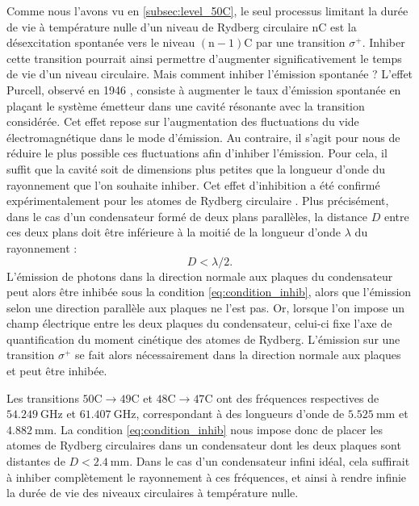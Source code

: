 Comme nous l'avons vu en \ref{subsec:level_50C}, le seul processus limitant la durée de vie à température nulle d'un niveau de Rydberg circulaire $\mathrm{nC}$ est la désexcitation spontanée vers le niveau $\mathrm{(n-1)C}$ par une transition $\sigma^+$.
Inhiber cette transition pourrait ainsi permettre d'augmenter significativement le temps de vie d'un niveau circulaire.
Mais comment inhiber l'émission spontanée ?
L'effet Purcell, observé en 1946 \cite{Purcell46_Purcelleffect}, consiste à augmenter le taux d'émission spontanée en plaçant le système émetteur dans une cavité résonante avec la transition considérée.
Cet effet repose sur l'augmentation des fluctuations du vide électromagnétique dans le mode d'émission.
Au contraire, il s'agit pour nous de réduire le plus possible ces fluctuations afin d'inhiber l'émission.
Pour cela, il suffit que la cavité soit de dimensions plus petites que la longueur d'onde du rayonnement que l'on souhaite inhiber.
Cet effet d'inhibition a été confirmé expérimentalement pour les atomes de Rydberg circulaire \cite{MX_KELPPNER_INHIBITION,MX_KLEPPNERINHIBITION85}.
Plus précisément, dans le cas d'un condensateur formé de deux plans parallèles, la distance $D$ entre ces deux plans doit être inférieure à la moitié de la longueur d'onde $\lambda$ du rayonnement :
%
\begin{equation}
\label{eq:condition_inhib}
D< \lambda/2.
\end{equation}
%
L'émission de photons dans la direction normale aux plaques du condensateur peut alors être inhibée sous la condition \eqref{eq:condition_inhib}, alors que l'émission selon une direction parallèle aux plaques ne l'est pas.
Or, lorsque l'on impose un champ électrique entre les deux plaques du condensateur, celui-ci fixe l'axe de quantification du moment cinétique des atomes de Rydberg.
L'émission sur une transition $\sigma^+$ se fait alors nécessairement dans la direction normale aux plaques et peut être inhibée.

Les transitions $\mathrm{50C}\!\rightarrow \!\mathrm{49C}$ et $\mathrm{48C}\!\rightarrow\! \mathrm{47C}$ ont des fréquences respectives de $\SI{54.249}{\GHz}$ et $\SI{61.407}{\GHz}$, correspondant à des longueurs d'onde de $\SI{5.525}{\mm}$ et $\SI{4.882}{\mm}$.
La condition \eqref{eq:condition_inhib} nous impose donc de placer les atomes de Rydberg circulaires dans un condensateur dont les deux plaques sont distantes de $D<\SI{2.4}{\mm}$.
Dans le cas d'un condensateur infini idéal, cela suffirait à inhiber complètement le rayonnement à ces fréquences, et ainsi à rendre infinie la durée de vie des niveaux circulaires à température nulle.

